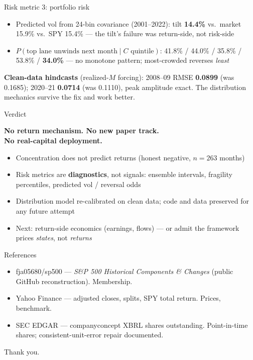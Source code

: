 \documentclass[10pt]{beamer}
\begin{document}
\begin{frame}{Risk metric 3: portfolio risk}
\begin{itemize}
\item Predicted vol from 24-bin covariance (2001--2022): tilt \textbf{14.4\%} vs.\ market 15.9\% vs.\ SPY 15.4\% --- the tilt's failure was return-side, not risk-side
\item $P(\text{top lane unwinds next month} \mid C\text{ quintile})$: 41.8\% / 44.0\% / 35.8\% / 53.8\% / \textbf{34.0\%} --- no monotone pattern; most-crowded reverses \emph{least}
\end{itemize}
\vspace{1em}
\textbf{Clean-data hindcasts} (realized-$M$ forcing): 2008--09 RMSE \textbf{0.0899} (was 0.1685); 2020--21 \textbf{0.0714} (was 0.1110), peak amplitude exact. The distribution mechanics survive the fix and work better.
\end{frame}

\begin{frame}{Verdict}
\begin{center}
\Large\bfseries\color{nmblue} No return mechanism. No new paper track.\\ No real-capital deployment.
\end{center}
\vspace{1em}
\begin{itemize}
\item Concentration does not predict returns (honest negative, $n=263$ months)
\item Risk metrics are \textbf{diagnostics}, not signals: ensemble intervals, fragility percentiles, predicted vol / reversal odds
\item Distribution model re-calibrated on clean data; code and data preserved for any future attempt
\item Next: return-side economics (earnings, flows) --- or admit the framework prices \emph{states}, not \emph{returns}
\end{itemize}
\end{frame}

\begin{frame}{References}
\footnotesize
\begin{itemize}
\item fja05680/sp500 --- \emph{S\&P 500 Historical Components \& Changes} (public GitHub reconstruction). Membership.
\item Yahoo Finance --- adjusted closes, splits, SPY total return. Prices, benchmark.
\item SEC EDGAR --- companyconcept XBRL shares outstanding. Point-in-time shares; consistent-unit-error repair documented.
\end{itemize}
\end{frame}

\begin{frame}
\begin{center}
\Large Thank you.
\end{center}
\end{frame}
\end{document}
